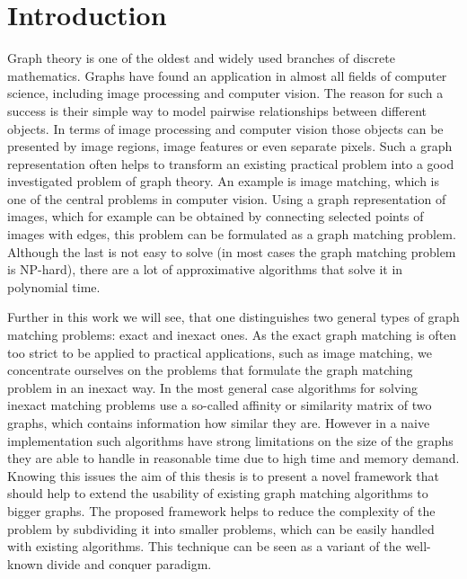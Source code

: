 \chapter{Introduction}
Graph theory is one of the oldest and widely used branches of discrete mathematics. Graphs have found an application in almost all fields of computer science, including image processing and computer vision. The reason for such a success is their simple way to model pairwise relationships between different objects. In terms of image processing and computer vision those objects can be presented by image regions, image features or even separate pixels. Such a graph representation often helps to transform an existing practical problem into a good investigated problem of graph theory. An example is image matching, which is one of the central problems in computer vision. %
Using a graph representation of images, which for example can be obtained by connecting selected points of images with edges, this problem can be formulated as a graph matching problem. Although the last is not easy to solve (in most cases the graph matching problem is NP-hard), there are a lot of approximative algorithms that solve it in polynomial time.

Further in this work we will see, that one distinguishes two general types of graph matching problems: exact and inexact ones. As the exact graph matching is often too strict to be applied to practical applications, such as image matching, we concentrate ourselves on the problems that formulate the graph matching problem in an inexact way.
In the most general case algorithms for solving inexact matching problems use a so-called affinity or similarity matrix of two graphs, which contains information how similar they are.
However in a naive implementation such algorithms have strong limitations on the size of the graphs they are able to handle in reasonable time due to high time and memory demand. Knowing this issues the aim of this thesis is to present a novel framework that should help to extend the usability of existing graph matching algorithms to bigger graphs. The proposed framework helps to reduce the complexity of the problem by subdividing it into smaller problems, which can be easily handled with existing algorithms. %
This technique can be seen as a variant of the well-known divide and conquer paradigm.

